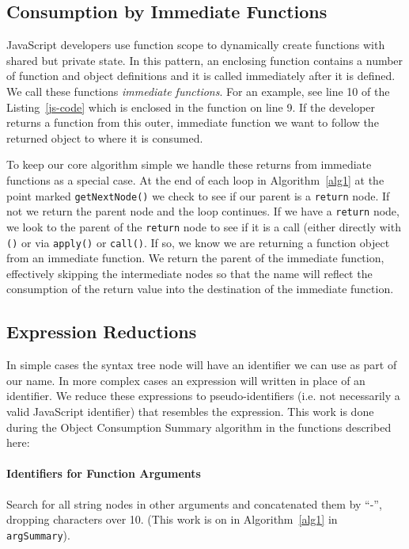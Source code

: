 \documentclass[10pt, preprint]{sigplanconf}
\begin{document}
{\subsection{Consumption by Immediate Functions}
\label{sec:immediate}
JavaScript developers use function scope to dynamically create functions with shared but private state. In this pattern, an enclosing function contains a number of function and object definitions and it is called immediately after it is defined. We call these functions \textit{immediate functions}.  For an example, see line 10 of the Listing~\ref{js-code} which is enclosed in the function on line 9. If the developer returns a function from this outer, immediate function we want to follow the returned object to where it is consumed. 

To keep our core algorithm simple we handle these returns from immediate functions as a special case. At the end of each loop in Algorithm~\ref{alg1} at the point marked \verb|getNextNode()| we check to see if our parent is a \verb|return| node.  If not we return the parent node and the loop continues. If we have a \verb|return| node, we look to the parent of the \verb|return| node to see if it is a call (either directly with \verb|()| or via \verb|apply()| or \verb|call()|. If so, we know we are returning a function object from an immediate function.  We return the parent of the immediate function, effectively skipping the intermediate nodes so that the name will reflect the consumption of the return value into the destination of the immediate function.

\subsection{Expression Reductions}
\label{sec:general-element-naming}

In simple cases the syntax tree node will have an identifier we can use as part of our name. In more complex cases an expression will written in place of an identifier. We reduce these expressions to pseudo-identifiers (i.e. not necessarily a valid JavaScript identifier) that resembles the expression. This work is done during the Object Consumption Summary algorithm in the functions described here:
\paragraph{Identifiers for Function Arguments} Search for all string nodes in other arguments and concatenated them by ``-'', dropping  characters over 10.  
 (This work is on in Algorithm~\ref{alg1} in \verb|argSummary|).
}
\end{document}
